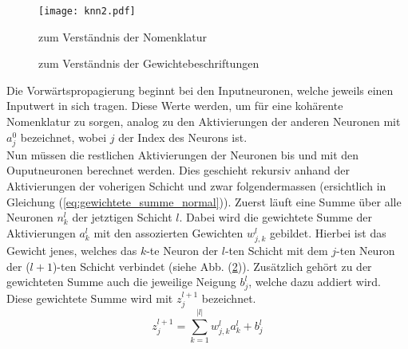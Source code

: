 \begin{figure}[h!]
  \centering
  \texttt{[image: knn2.pdf]}
  \caption{zum Verständnis der Nomenklatur}
  \label{fig:nomenklatur1}
\end{figure}
\para{}
\begin{figure}[h!]
  \centering
  \caption{zum Verständnis der Gewichtebeschriftungen}
  \label{fig:nomenklatur2}
\end{figure}
\para{}
Die Vorwärtspropagierung beginnt bei den Inputneuronen, welche jeweils
einen Inputwert in sich tragen. Diese Werte werden, um für eine kohärente Nomenklatur zu sorgen,
analog zu den Aktivierungen der anderen Neuronen mit $a_j^0$ bezeichnet, wobei
$j$ der Index des Neurons ist. \\
Nun müssen die restlichen Aktivierungen der Neuronen bis und mit den Ouputneuronen berechnet werden. Dies geschieht rekursiv anhand der
Aktivierungen der voherigen Schicht und zwar folgendermassen (ersichtlich in
Gleichung (\ref{eq:gewichtete_summe_normal})).
\para{}
Zuerst läuft eine Summe über alle Neuronen $n_k^{l}$ der jetztigen Schicht
$l$. Dabei wird die gewichtete Summe der Aktivierungen $a_k^{l}$ mit den
assozierten Gewichten $w_{j,k}^l$ gebildet. Hierbei ist das Gewicht jenes, welches das
$k$-te Neuron der $l$-ten Schicht mit dem $j$-ten Neuron der ($l+1$)-ten Schicht
verbindet (siehe Abb. (\ref{fig:nomenklatur2})).
Zusätzlich gehört zu der gewichteten Summe auch die jeweilige Neigung $b_j^l$, welche
dazu addiert wird. Diese gewichtete Summe wird mit $z_j^{l+1}$ bezeichnet.
\\
\begin{equation}\tag{FP1}\label{eq:gewichtete_summe_normal}
  z_j^{l+1} = \sum_{k=1}^{|l|} w_{j,k}^l a_k^l + b_j^l
\end{equation}
\\
